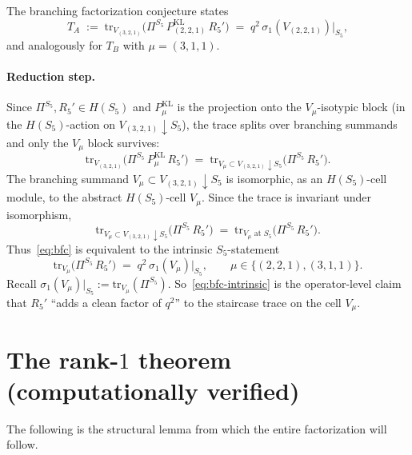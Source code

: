 \documentclass[11pt]{article}
\theoremstyle{definition}
\begin{document}
The branching factorization conjecture states
\begin{equation}\label{eq:bfc}
T_A \;:=\; \mathrm{tr}_{V_{(3,2,1)}}\!\bigl(\Pi^{S_5}\, P_{(2,2,1)}^{\mathrm{KL}}\, R_5'\bigr) \;=\; q^2\, \sigma_1(V_{(2,2,1)})\big|_{S_5},
\end{equation}
and analogously for $T_B$ with $\mu = (3,1,1)$.

\paragraph{Reduction step.} Since $\Pi^{S_5}, R_5' \in H(S_5)$ and $P_\mu^{\mathrm{KL}}$ is the projection onto the $V_\mu$-isotypic block (in the $H(S_5)$-action on $V_{(3,2,1)}{\downarrow}S_5$), the trace splits over branching summands and only the $V_\mu$ block survives:
\[
\mathrm{tr}_{V_{(3,2,1)}}\!\bigl(\Pi^{S_5}\, P_\mu^{\mathrm{KL}}\, R_5'\bigr)
\;=\; \mathrm{tr}_{V_\mu \subset V_{(3,2,1)}{\downarrow}S_5}\!\bigl(\Pi^{S_5}\, R_5'\bigr).
\]
The branching summand $V_\mu \subset V_{(3,2,1)}{\downarrow}S_5$ is isomorphic, as an $H(S_5)$-cell module, to the abstract $H(S_5)$-cell $V_\mu$. Since the trace is invariant under isomorphism,
\[
\mathrm{tr}_{V_\mu \subset V_{(3,2,1)}{\downarrow}S_5}\!\bigl(\Pi^{S_5}\, R_5'\bigr)
\;=\; \mathrm{tr}_{V_\mu \text{ at } S_5}\!\bigl(\Pi^{S_5}\, R_5'\bigr).
\]
Thus~\eqref{eq:bfc} is equivalent to the intrinsic $S_5$-statement
\begin{equation}\label{eq:bfc-intrinsic}
\mathrm{tr}_{V_\mu}\!\bigl(\Pi^{S_5}\, R_5'\bigr) \;=\; q^2\, \sigma_1(V_\mu)\big|_{S_5}, \qquad \mu \in \{(2,2,1), (3,1,1)\}.
\end{equation}
Recall $\sigma_1(V_\mu)|_{S_5} := \mathrm{tr}_{V_\mu}(\Pi^{S_5})$. So~\eqref{eq:bfc-intrinsic} is the operator-level claim that $R_5'$ ``adds a clean factor of $q^2$'' to the staircase trace on the cell $V_\mu$.

\section{The rank-$1$ theorem (computationally verified)}\label{sec:rank1}

The following is the structural lemma from which the entire factorization will follow.
\end{document}
